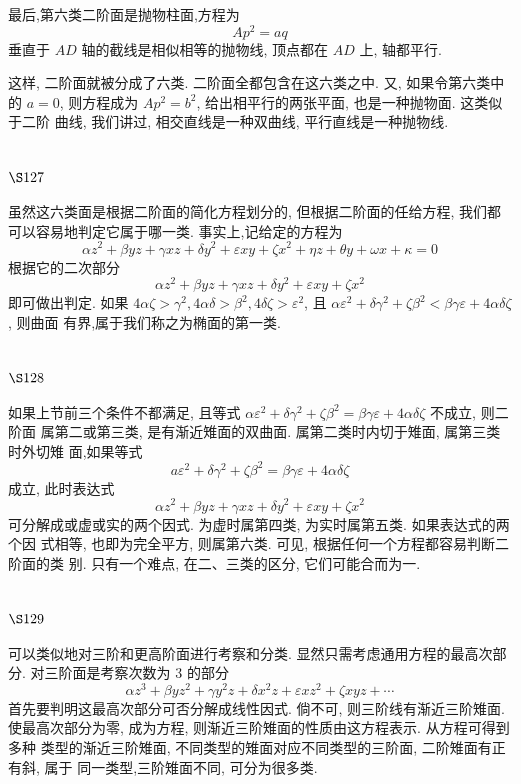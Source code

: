 最后,第六类二阶面是抛物柱面,方程为
\[
A p^{2}=a q
\]
垂直于 $A D$ 轴的截线是相似相等的抛物线, 顶点都在 $A D$ 上, 轴都平行.

这样, 二阶面就被分成了六类. 二阶面全都包含在这六类之中. 又, 如果令第六类中 的 $a=0$, 则方程成为 $A p^{2}=b^{2}$, 给出相平行的两张平面, 也是一种抛物面. 这类似于二阶 曲线, 我们讲过, 相交直线是一种双曲线, 平行直线是一种抛物线.

\section{$\S 127$}

虽然这六类面是根据二阶面的简化方程划分的, 但根据二阶面的任给方程, 我们都 可以容易地判定它属于哪一类. 事实上,记给定的方程为
\[
\alpha z^{2}+\beta y z+\gamma x z+\delta y^{2}+\varepsilon x y+\zeta x^{2}+\eta z+\theta y+\omega x+\kappa=0
\]
根据它的二次部分
\[
\alpha z^{2}+\beta y z+\gamma x z+\delta y^{2}+\varepsilon x y+\zeta x^{2}
\]
即可做出判定. 如果 $4 \alpha \zeta>\gamma^{2}, 4 \alpha \delta>\beta^{2}, 4 \delta \zeta>\varepsilon^{2}$, 且 $\alpha \varepsilon^{2}+\delta \gamma^{2}+\zeta \beta^{2}<\beta \gamma \varepsilon+4 \alpha \delta \zeta$, 则曲面 有界,属于我们称之为椭面的第一类.

\section{$\S 128$}

如果上节前三个条件不都满足, 且等式 $\alpha \varepsilon^{2}+\delta \gamma^{2}+\zeta \beta^{2}=\beta \gamma \varepsilon+4 \alpha \delta \zeta$ 不成立, 则二阶面 属第二或第三类, 是有渐近雉面的双曲面. 属第二类时内切于雉面, 属第三类时外切雉 面,如果等式
\[
a \varepsilon^{2}+\delta \gamma^{2}+\zeta \beta^{2}=\beta \gamma \varepsilon+4 \alpha \delta \zeta
\]
成立, 此时表达式
\[
\alpha z^{2}+\beta y z+\gamma x z+\delta y^{2}+\varepsilon x y+\zeta x^{2}
\]
可分解成或虚或实的两个因式. 为虚时属第四类, 为实时属第五类. 如果表达式的两个因 式相等, 也即为完全平方, 则属第六类. 可见, 根据任何一个方程都容易判断二阶面的类 别. 只有一个难点, 在二、三类的区分, 它们可能合而为一.

\section{$\S 129$}

可以类似地对三阶和更高阶面进行考察和分类. 显然只需考虑通用方程的最高次部 分. 对三阶面是考察次数为 3 的部分
\[
\alpha z^{3}+\beta y z^{2}+\gamma y^{2} z+\delta x^{2} z+\varepsilon x z^{2}+\zeta x y z+\cdots
\]
首先要判明这最高次部分可否分解成线性因式. 倘不可, 则三阶线有渐近三阶雉面. 使最高次部分为零, 成为方程, 则渐近三阶雉面的性质由这方程表示. 从方程可得到多种 类型的渐近三阶雉面, 不同类型的雉面对应不同类型的三阶面, 二阶雉面有正有斜, 属于 同一类型,三阶雉面不同, 可分为很多类.

